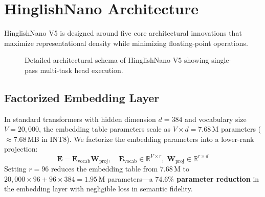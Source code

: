 \documentclass[11pt,a4paper]{article}
\begin{document}
\section{HinglishNano Architecture}

HinglishNano V5 is designed around five core architectural innovations that maximize representational density while minimizing floating-point operations.

\begin{figure}[htbp]
    \centering
    \caption{Detailed architectural schema of HinglishNano V5 showing single-pass multi-task head execution.}
    \label{fig:arch_diagram}
\end{figure}

\subsection{Factorized Embedding Layer}
In standard transformers with hidden dimension $d=384$ and vocabulary size $V=20,000$, the embedding table parameters scale as $V \times d = 7.68$\,M parameters ($\approx 7.68$\,MB in INT8). We factorize the embedding parameters into a lower-rank projection:
\begin{equation}
    \mathbf{E} = \mathbf{E}_{\text{vocab}} \mathbf{W}_{\text{proj}}, \quad \mathbf{E}_{\text{vocab}} \in \mathbb{R}^{V \times r}, \; \mathbf{W}_{\text{proj}} \in \mathbb{R}^{r \times d}
\end{equation}
Setting $r=96$ reduces the embedding table from $7.68$\,M to $20,000 \times 96 + 96 \times 384 = 1.95$\,M parameters---a \textbf{$74.6\%$ parameter reduction} in the embedding layer with negligible loss in semantic fidelity.
\end{document}
